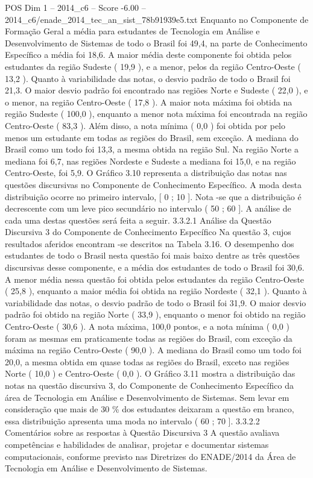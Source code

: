 \begin{textsample}{POS Dim 1 – 2014\_c6 – Score -6.00 – 2014\_c6/enade\_2014\_tec\_an\_sist\_78b91939e5.txt}
Enquanto no Componente de Formação Geral a média para estudantes de Tecnologia em Análise e Desenvolvimento de Sistemas de todo o Brasil foi 49,4, na parte de Conhecimento Específico a média foi 18,6.
A maior média deste componente foi obtida pelos estudantes da região Sudeste ( 19,9 ), e a menor, pelos da região Centro-Oeste ( 13,2 ).
Quanto à variabilidade das notas, o desvio padrão de todo o Brasil foi 21,3.
O maior desvio padrão foi encontrado nas regiões Norte e Sudeste ( 22,0 ), e o menor, na região Centro-Oeste ( 17,8 ).
A maior nota máxima foi obtida na região Sudeste ( 100,0 ), enquanto a menor nota máxima foi encontrada na região Centro-Oeste ( 83,3 ).
Além disso, a nota mínima ( 0,0 ) foi obtida por pelo menos um estudante em todas as regiões do Brasil, sem exceção.
A mediana do Brasil como um todo foi 13,3, a mesma obtida na região Sul.
Na região Norte a mediana foi 6,7, nas regiões Nordeste e Sudeste a mediana foi 15,0, e na região Centro-Oeste, foi 5,9.
O Gráfico 3.10 representa a distribuição das notas nas questões discursivas no Componente de Conhecimento Específico.
A moda desta distribuição ocorre no primeiro intervalo, [ 0 ; 10 ].
Nota -se que a distribuição é decrescente com um leve pico secundário no intervalo ( 50 ; 60 ].
A análise de cada uma destas questões será feita a seguir. 3.3.2.1 Análise da Questão Discursiva 3 do Componente de Conhecimento Específico Na questão 3, cujos resultados aferidos encontram -se descritos na Tabela 3.16.
O desempenho dos estudantes de todo o Brasil nesta questão foi mais baixo dentre as três questões discursivas desse componente, e a média dos estudantes de todo o Brasil foi 30,6.
A menor média nessa questão foi obtida pelos estudantes da região Centro-Oeste ( 25,8 ), enquanto a maior média foi obtida na região Nordeste ( 32,1 ).
Quanto à variabilidade das notas, o desvio padrão de todo o Brasil foi 31,9.
O maior desvio padrão foi obtido na região Norte ( 33,9 ), enquanto o menor foi obtido na região Centro-Oeste ( 30,6 ).
A nota máxima, 100,0 pontos, e a nota mínima ( 0,0 ) foram as mesmas em praticamente todas as regiões do Brasil, com exceção da máxima na região Centro-Oeste ( 90,0 ).
A mediana do Brasil como um todo foi 20,0, a mesma obtida em quase todas as regiões do Brasil, exceto nas regiões Norte ( 10,0 ) e Centro-Oeste ( 0,0 ).
O Gráfico 3.11 mostra a distribuição das notas na questão discursiva 3, do Componente de Conhecimento Específico da área de Tecnologia em Análise e Desenvolvimento de Sistemas.
Sem levar em consideração que mais de 30 \% dos estudantes deixaram a questão em branco, essa distribuição apresenta uma moda no intervalo ( 60 ; 70 ]. 3.3.2.2 Comentários sobre as respostas à Questão Discursiva 3 A questão avaliava competências e habilidades de analisar, projetar e documentar sistemas computacionais, conforme previsto nas Diretrizes do ENADE/2014 da Área de Tecnologia em Análise e Desenvolvimento de Sistemas.

\end{textsample}
